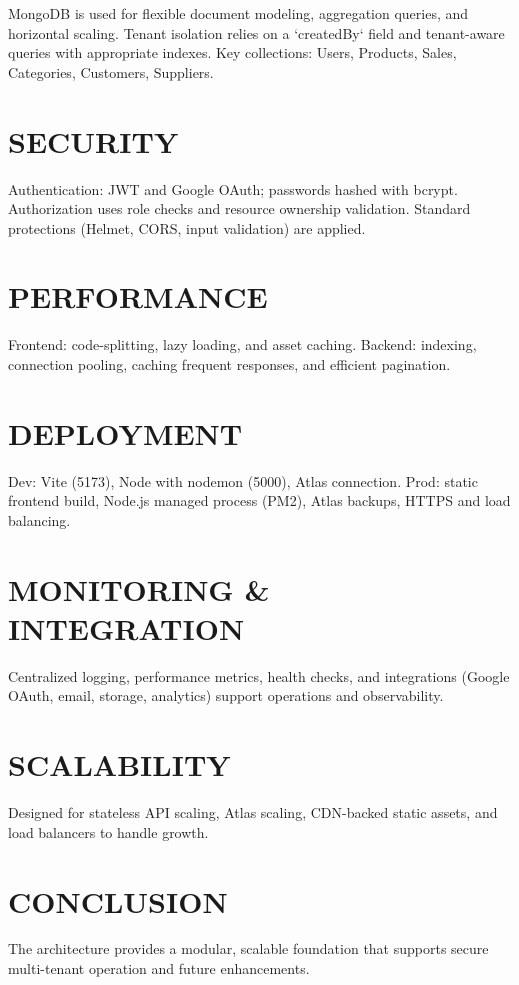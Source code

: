 MongoDB is used for flexible document modeling, aggregation queries, and horizontal scaling. Tenant isolation relies on a `createdBy` field and tenant-aware queries with appropriate indexes. Key collections: Users, Products, Sales, Categories, Customers, Suppliers.

\section{SECURITY}

Authentication: JWT and Google OAuth; passwords hashed with bcrypt. Authorization uses role checks and resource ownership validation. Standard protections (Helmet, CORS, input validation) are applied.

\section{PERFORMANCE}

Frontend: code-splitting, lazy loading, and asset caching. Backend: indexing, connection pooling, caching frequent responses, and efficient pagination.

\section{DEPLOYMENT}

Dev: Vite (5173), Node with nodemon (5000), Atlas connection. Prod: static frontend build, Node.js managed process (PM2), Atlas backups, HTTPS and load balancing.

\section{MONITORING \& INTEGRATION}

Centralized logging, performance metrics, health checks, and integrations (Google OAuth, email, storage, analytics) support operations and observability.

\section{SCALABILITY}

Designed for stateless API scaling, Atlas scaling, CDN-backed static assets, and load balancers to handle growth.

\section{CONCLUSION}

The architecture provides a modular, scalable foundation that supports secure multi-tenant operation and future enhancements.